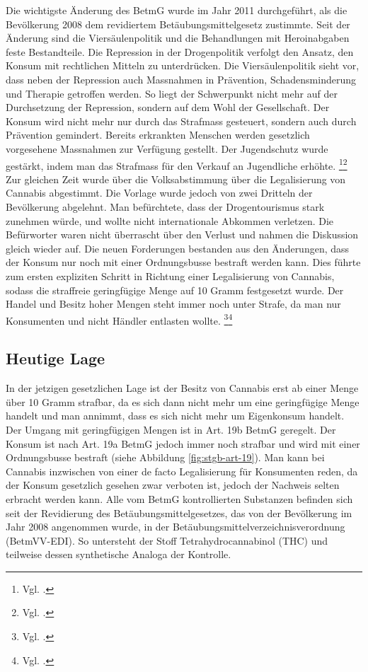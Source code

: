 \documentclass[../main.tex]{subfiles}
\begin{document}
	 \noindent
	 Die wichtigste Änderung des BetmG wurde im Jahr 2011 durchgeführt, als die Bevölkerung 2008 dem revidiertem Betäubungsmittelgesetz zustimmte. 
	 Seit der Änderung sind die Viersäulenpolitik und die Behandlungen mit Heroinabgaben feste Bestandteile. 
	 Die Repression in der Drogenpolitik verfolgt den Ansatz, den Konsum mit rechtlichen Mitteln zu unterdrücken.	 
	 Die Viersäulenpolitik sieht vor, dass neben der Repression auch Massnahmen in Prävention, Schadensminderung und Therapie getroffen werden. 
	 So liegt der Schwerpunkt nicht mehr auf der Durchsetzung der Repression, sondern auf dem Wohl der Gesellschaft.
	 Der Konsum wird nicht mehr nur durch das Strafmass gesteuert, sondern auch durch Prävention gemindert. 
	 Bereits erkrankten Menschen werden gesetzlich vorgesehene Massnahmen zur Verfügung gestellt.
	 Der Jugendschutz wurde gestärkt, indem man das Strafmass für den Verkauf an Jugendliche erhöhte.%
	 \footnote{Vgl. \cite{infoset-01}.}\footnote{Vgl. \cite{parlament-01}.}\\
	 
	 \noindent
	 Zur gleichen Zeit wurde über die Volksabstimmung über die Legalisierung von Cannabis abgestimmt.
	 Die Vorlage wurde jedoch von zwei Dritteln der Bevölkerung abgelehnt.
	 Man befürchtete, dass der Drogentourismus stark zunehmen würde, und wollte nicht internationale Abkommen verletzen.
	 Die Befürworter waren nicht überrascht über den Verlust und nahmen die Diskussion gleich wieder auf. 
	 Die neuen Forderungen bestanden aus den Änderungen, dass der Konsum nur noch mit einer Ordnungsbusse bestraft werden kann. 
	 Dies führte zum ersten expliziten Schritt in Richtung einer Legalisierung von Cannabis, sodass die straffreie geringfügige Menge auf 10 Gramm festgesetzt wurde.
	 Der Handel und Besitz hoher Mengen steht immer noch unter Strafe, da man nur Konsumenten und nicht Händler entlasten wollte.%
	 \footnote{Vgl. \cite{infoset-02}.}\footnote{Vgl. \cite{parlament-02}.}
	 
	 
	 \subsection{Heutige Lage}
	 In der jetzigen gesetzlichen Lage ist der Besitz von Cannabis erst ab einer Menge über 10 Gramm strafbar, da es sich dann nicht mehr um eine geringfügige Menge handelt und man annimmt, dass es sich nicht mehr um Eigenkonsum handelt.
	 Der Umgang mit geringfügigen Mengen ist in Art. 19b BetmG geregelt.
	 Der Konsum ist nach Art. 19a BetmG jedoch immer noch strafbar und wird mit einer Ordnungsbusse bestraft (siehe Abbildung \ref{fig:stgb-art-19}). 
	 Man kann bei Cannabis inzwischen von einer de facto Legalisierung für Konsumenten reden, da der Konsum gesetzlich gesehen zwar verboten ist, jedoch der Nachweis selten erbracht werden kann. 
	 Alle vom BetmG kontrollierten Substanzen befinden sich seit der Revidierung des Betäubungsmittelgesetzes, das von der Bevölkerung im Jahr 2008 angenommen wurde, in der Betäubungsmittelverzeichnisverordnung (BetmVV-EDI). 
	 So untersteht der Stoff Tetrahydrocannabinol (THC) und teilweise dessen synthetische Analoga der Kontrolle.\vspace{2pt}
	 
\end{document}
